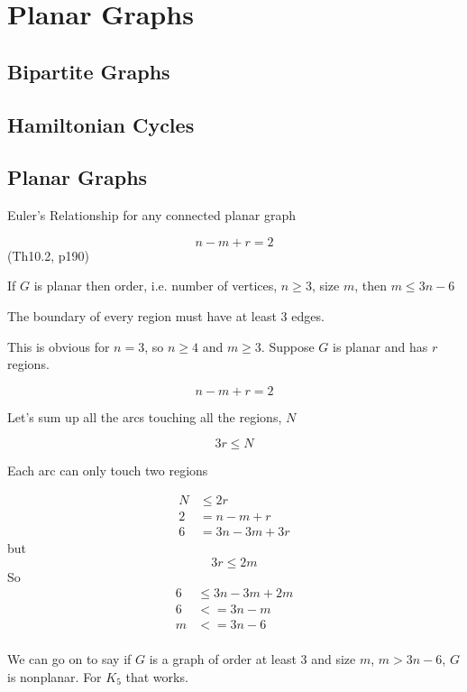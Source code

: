 \section{Planar Graphs}
\label{title}

\subsection{Bipartite Graphs}
\label{Bipartite}

\subsection{Hamiltonian Cycles}
\label{ham-cycles}

\subsection{Planar Graphs}
\label{planar}

Euler’s Relationship for any connected planar graph 

\[
n - m + r = 2 
\]
(Th10.2, p190)

If $G$ is planar then order, i.e. number of vertices, $n \ge 3$, size $m$, then $m \le 3n - 6$

The boundary of every region must have at least 3 edges.

This is obvious for $n = 3$, so $n \ge 4$ and $m \ge 3$. 
Suppose $G$ is planar and has $r$ regions. 

\[ n - m + r = 2 \]   

Let’s sum up all the arcs touching all the regions, $N$

\[ 3r \le N \]

Each arc can only touch two regions 



\begin{align}
N &\le 2r \\ 
2 &= n - m + r \\
6 &= 3n -3m + 3r
\end{align}
but 
\[
3r \le 2m 
\]
So 
\begin{align}
6 &\le 3n - 3m + 2m \\
6 &<= 3n -m \\
m &<= 3n - 6 \\ 
\end{align}

We can go on to say if $G$ is a graph of order at least 3 and size $m$, $m > 3n - 6$, $G$ is nonplanar. For $K_5$  that works. 

